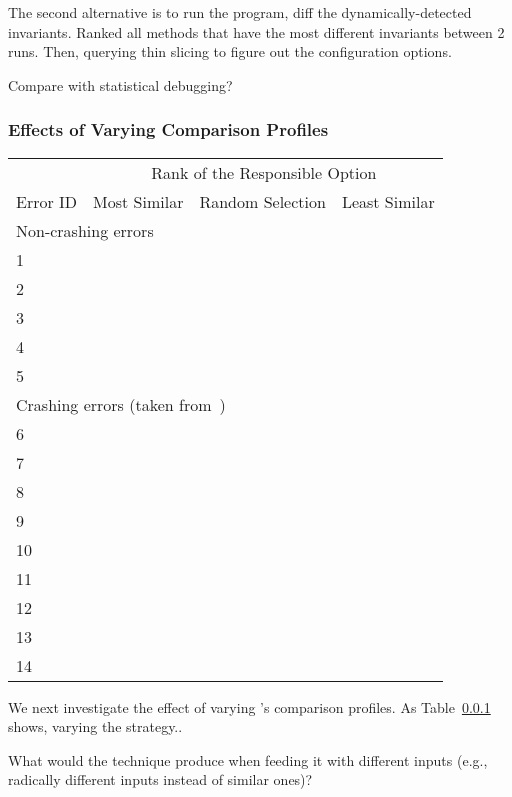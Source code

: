 The second alternative is to run the program, diff the dynamically-detected invariants. Ranked all
methods that have the most different invariants between 2 runs. Then, querying thin slicing to
figure out the configuration options.

Compare with statistical debugging?

\subsubsection{Effects of Varying Comparison Profiles}


\begin{table}[t]
\setlength{\tabcolsep}{.54\tabcolsep}
\begin{tabular}{|l|l|l|l|}
\hline
  & \multicolumn{3}{|c|}{Rank of the Responsible Option } \\
\cline{2-4}
 Error ID & Most Similar& Random Selection& Least Similar\\
 \hline
\hline
\multicolumn{4}{|l|}{Non-crashing errors}   \\
 \hline
 1 & & &\\
 2 & & &\\
 3 & & &\\
 4 & & &\\
 5 & & &\\
\hline
\hline
\multicolumn{4}{|l|}{Crashing errors (taken from~\cite{Rabkin:2011:PPC})}   \\
\hline
 6 & & &\\
 7 & & &\\
 8 & & &\\
 9 & & &\\
 10 & & &\\
 11 & & &\\
 12 & & &\\
 13 & & &\\
 14 & & &\\
\hline
\end{tabular}

\end{table}


We next investigate the effect of varying \ourtool's
comparison profiles. As Table~\ref{} shows, varying the
strategy..


What would the technique produce when feeding it with different inputs (e.g.,
radically different inputs instead of similar ones)?

